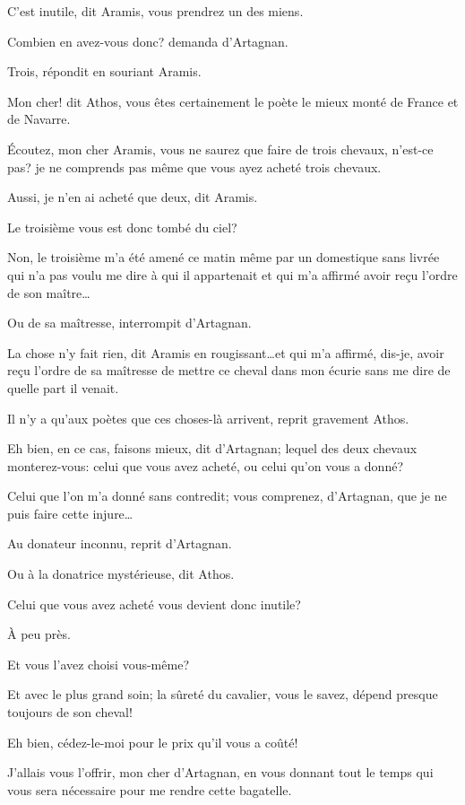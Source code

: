 \speak  C'est inutile, dit Aramis, vous prendrez un des miens. 

\speak  Combien en avez-vous donc? demanda d'Artagnan. 

\speak  Trois, répondit en souriant Aramis. 

\speak  Mon cher! dit Athos, vous êtes certainement le poète le mieux monté de France et de Navarre. 

\speak  Écoutez, mon cher Aramis, vous ne saurez que faire de trois chevaux, n'est-ce pas? je ne comprends pas même que vous ayez acheté trois chevaux. 

\speak  Aussi, je n'en ai acheté que deux, dit Aramis. 

\speak  Le troisième vous est donc tombé du ciel? 

\speak  Non, le troisième m'a été amené ce matin même par un domestique sans livrée qui n'a pas voulu me dire à qui il appartenait et qui m'a affirmé avoir reçu l'ordre de son maître\dots 

\speak  Ou de sa maîtresse, interrompit d'Artagnan. 

\speak  La chose n'y fait rien, dit Aramis en rougissant\dots et qui m'a affirmé, dis-je, avoir reçu l'ordre de sa maîtresse de mettre ce cheval dans mon écurie sans me dire de quelle part il venait. 

\speak  Il n'y a qu'aux poètes que ces choses-là arrivent, reprit gravement Athos. 

\speak  Eh bien, en ce cas, faisons mieux, dit d'Artagnan; lequel des deux chevaux monterez-vous: celui que vous avez acheté, ou celui qu'on vous a donné? 

\speak  Celui que l'on m'a donné sans contredit; vous comprenez, d'Artagnan, que je ne puis faire cette injure\dots 

\speak  Au donateur inconnu, reprit d'Artagnan. 

\speak  Ou à la donatrice mystérieuse, dit Athos. 

\speak  Celui que vous avez acheté vous devient donc inutile? 

\speak  À peu près. 

\speak  Et vous l'avez choisi vous-même? 

\speak  Et avec le plus grand soin; la sûreté du cavalier, vous le savez, dépend presque toujours de son cheval! 

\speak  Eh bien, cédez-le-moi pour le prix qu'il vous a coûté! 

\speak  J'allais vous l'offrir, mon cher d'Artagnan, en vous donnant tout le temps qui vous sera nécessaire pour me rendre cette bagatelle. 

